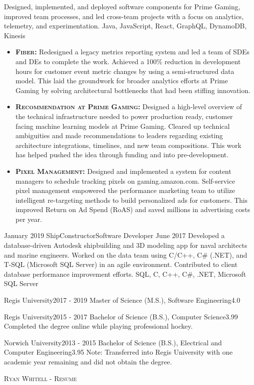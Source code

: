 \documentclass{cv}
\begin{document}
\begin{experiences_env}
{								Designed, implemented, and deployed software components for Prime Gaming, improved team processes, and led cross-team projects with a focus on analytics, telemetry, and experimentation.
							}
							{Java, JavaScript, React, GraphQL, DynamoDB, Kinesis}
							{
								\begin{itemize}
									\item \textbf{\textsc{Fiber:}} Redesigned a legacy metrics reporting system and led a team of SDEs and DEs to complete the work. Achieved a 100\% reduction in development hours for customer event metric changes by using a semi-structured data model. This laid the groundwork for broader analytics efforts at Prime Gaming by solving architectural bottlenecks that had been stifling innovation.
									\item \textbf{\textsc{Recommendation at Prime Gaming:}} Designed a high-level overview of the technical infrastructure needed to power production ready, customer facing machine learning models at Prime Gaming. Cleared up technical ambiguities and made recommendations to leaders regarding existing architecture integrations, timelines, and new team compositions. This work has helped pushed the idea through funding and into pre-development.
									\item \textbf{\textsc{Pixel Management:}} Designed and implemented a system for content managers to schedule tracking pixels on gaming.amazon.com. Self-service pixel management empowered the performance marketing team to utilize intelligent re-targeting methods to build personalized ads for customers. This improved Return on Ad Spend (RoAS) and saved millions in advertising costs per year.
								\end{itemize}
							}
		\emptySeparator
		\experienceWithoutProjects
			{January 2019}  {ShipConstructor}{Software Developer}
			{June 2017}     {
								Developed a database-driven Autodesk shipbuilding and 3D modeling app for naval architects and marine engineers. Worked on the data team using C/C++, C\# (.NET), and T-SQL (Microsoft SQL Server) in an agile environment. Contributed to client database performance improvement efforts.
							}
							{SQL, C, C++, C\#, .NET, Microsoft SQL Server}
		\emptySeparator
	\end{experiences_env}

	\begin{education_env}
		\education
		{Regis University}{2017 - 2019}
		{Master of Science (M.S.), Software Engineering}{4.0}
		{}
					
		\education
		{Regis University}{2015 - 2017}
		{Bachelor of Science (B.S.), Computer Science}{3.99}
		{Completed the degree online while playing professional hockey.}

		\education
		{Norwich University}{2013 - 2015}
		{Bachelor of Science (B.S.), Electrical and Computer Engineering}{3.95}
		{Note: Transferred into Regis University with one academic year remaining and did not obtain the degree.}
	\end{education_env}

	\makecvfooter
	{}
	{\textsc{Ryan Whitell - Resume}}
	{}
\end{document}
